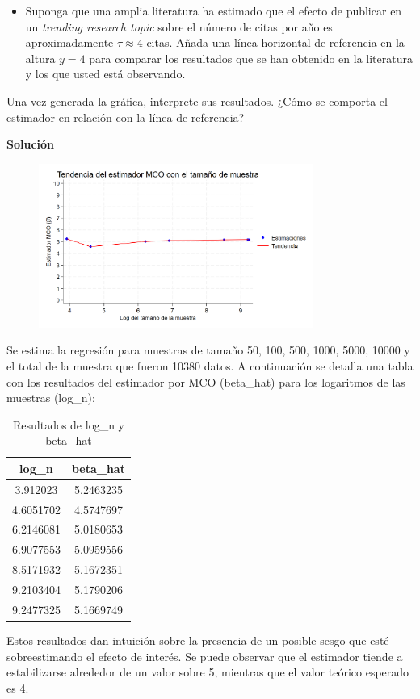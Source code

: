 \documentclass[a4paper, answers, addpoints, 11pt]{exam}
\newenvironment{solucion}{%
  \begin{mdframed}[
    backgroundcolor=blue!5,    %
    linecolor=blue!50,          %
    linewidth=2pt,              %
    leftmargin=10pt,            %
    rightmargin=10pt,           %
    topline=true,              %
    bottomline=true,            %
    roundcorner=10pt,           %
    innerleftmargin=10pt,       %
    innerrightmargin=10pt,      %
    innerbottommargin=10pt,     %
    innertopmargin=10pt         %
  ]%
  \begin{tcolorbox}[colframe=blue!50!black, colback=blue!50, coltitle=white, sharp corners=all, boxrule=1mm, width=\textwidth, halign=left, valign=center, top=0mm, bottom=0mm, left=0mm, right=0mm] \textbf{Solución} \end{tcolorbox} }{\end{mdframed}}
\begin{document}
\begin{itemize}
\begin{itemize}
        \item Suponga que una amplia literatura ha estimado que el efecto de publicar en un \textit{trending research topic} sobre el número de citas por año es aproximadamente $\tau \approx 4$ citas. Añada una línea horizontal de referencia en la altura $y=4$ para comparar los resultados que se han obtenido en la literatura y los que usted está observando.
    \end{itemize}  

    Una vez generada la gráfica, interprete sus resultados. ¿Cómo se comporta el estimador en relación con la línea de referencia?
     \begin{solucion}
        
        \begin{figure}[H]  %
    \centering
    \includegraphics[width=0.8\textwidth]{output/figures/graficoconinter.png} 
    \label{fig:mi_grafico}
\end{figure}Se estima la regresión para muestras de tamaño 50, 100, 500, 1000, 5000, 10000  y el total de la muestra que fueron 10380 datos. A continuación se detalla una tabla con los resultados del estimador por MCO (beta\_hat) para los logaritmos de las muestras (log\_n): 
\begin{table}[H]
    \centering
    \caption{Resultados de log\_n y beta\_hat}
    \begin{tabular}{cc}
        \toprule
         \textbf{log\_n} & \textbf{beta\_hat} \\
        \midrule
        3.912023  & 5.2463235 \\
         4.6051702 & 4.5747697 \\
         6.2146081 & 5.0180653 \\
         6.9077553 & 5.0959556 \\
        8.5171932 & 5.1672351 \\
         9.2103404 & 5.1790206 \\
        9.2477325 & 5.1669749 \\
        \bottomrule
    \end{tabular}
    \label{tab:resultados}
\end{table}
Estos resultados dan intuición sobre la presencia de un posible sesgo que esté sobreestimando el efecto de interés. Se puede observar que el estimador tiende a estabilizarse alrededor de un valor sobre 5, mientras que el valor teórico esperado es 4. 


\end{solucion}
\end{itemize}
\end{document}
